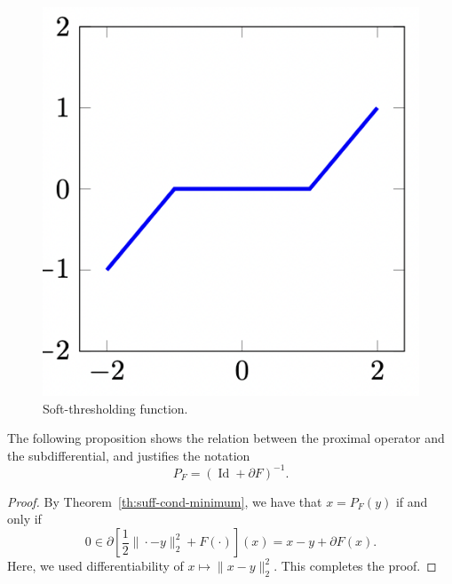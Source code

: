 
 \begin{figure}
     \centering
     \includegraphics[width=.3\textwidth]{images/soft-thresholding.png}
     \caption{Soft-thresholding function.}
     \label{fig:soft-thresholding}
 \end{figure}
 
 
 The following proposition shows the relation between the proximal operator and the subdifferential, and justifies the notation
 \begin{equation}
     P_F = (\operatorname{Id} + \partial F)^{-1}.
 \end{equation}
 
 
 \begin{proof}
     By Theorem~\ref{th:suff-cond-minimum}, we have that $x=P_F(y)$ if and only if
     \begin{equation}
         0 \in \partial\left[ \frac12 \|\cdot-y\|_2^2 + F(\cdot)\right](x) = x - y +\partial F(x).
     \end{equation}
     Here, we used differentiability of $x\mapsto \|x-y\|_2^2$. This completes the proof.
 \end{proof}
 
